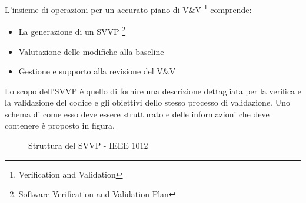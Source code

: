 L'insieme di operazioni per un accurato piano di V\&V \footnote{Verification and Validation} comprende:
\begin{itemize}
\item La generazione di un SVVP \footnote{Software Verification and Validation Plan}
\item Valutazione delle modifiche alla baseline
\item Gestione e supporto alla revisione del V\&V
\end{itemize}
Lo scopo dell'SVVP è quello di fornire una descrizione dettagliata per la verifica e la validazione del codice e gli obiettivi dello stesso processo di validazione.\cite{ieee1012}
Uno schema di come esso deve essere strutturato e delle informazioni che deve contenere è proposto in figura.
\begin{figure}[H]
\centering
{}
\caption{Struttura del SVVP - IEEE 1012\cite{ieee1012}}\label{fig:1}
\end{figure}
